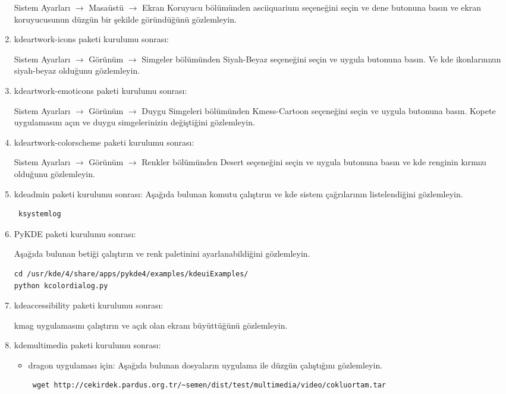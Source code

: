 \documentclass[a4paper,10pt]{article}
\begin{document}
\begin{enumerate}
Sistem Ayarları $\rightarrow$ Masaüstü $\rightarrow$ Ekran Koruyucu bölümünden asciiquarium seçeneğini seçin ve dene butonuna basın ve ekran koruyucusunun düzgün bir şekilde göründüğünü gözlemleyin.

\item kdeartwork-icons paketi kurulumu sonrası:

Sistem Ayarları $\rightarrow$ Görünüm $\rightarrow$ Simgeler bölümünden Siyah-Beyaz seçeneğini seçin ve uygula butonuna basın. Ve kde ikonlarınızın siyah-beyaz olduğunu gözlemleyin.

\item kdeartwork-emoticons paketi kurulumu sonrası:

Sistem Ayarları $\rightarrow$ Görünüm $\rightarrow$ Duygu Simgeleri bölümünden Kmess-Cartoon seçeneğini seçin ve uygula butonuna basın. Kopete uygulamasını açın ve duygu simgelerinizin değiştiğini gözlemleyin.

\item kdeartwork-colorscheme paketi kurulumu sonrası:

Sistem Ayarları $\rightarrow$ Görünüm $\rightarrow$ Renkler bölümünden Desert seçeneğini seçin ve uygula butonuna basın ve kde renginin kırmızı olduğunu gözlemleyin.

\item kdeadmin paketi kurulumu sonrası:
Aşağıda bulunan komutu çalıştırın ve kde sistem çağrılarının listelendiğini gözlemleyin.
\begin{verbatim}
 ksystemlog
\end{verbatim}

\item PyKDE paketi kurulumu sonrası:

Aşağıda bulunan betiği çalıştırın ve renk paletinini ayarlanabildiğini gözlemleyin.
\begin{verbatim}
cd /usr/kde/4/share/apps/pykde4/examples/kdeuiExamples/
python kcolordialog.py
\end{verbatim}

\item kdeaccessibility paketi kurulumu sonrası:

kmag uygulamasını çalıştırın ve açık olan ekranı büyüttüğünü gözlemleyin.

\item kdemultimedia paketi kurulumu sonrası:
\begin{itemize}
 \item dragon uygulaması için:
Aşağıda bulunan dosyaların uygulama ile düzgün çalıştığını gözlemleyin.
\begin{verbatim}
 wget http://cekirdek.pardus.org.tr/~semen/dist/test/multimedia/video/cokluortam.tar
\end{verbatim}


\end{itemize}
\end{enumerate}
\end{document}

